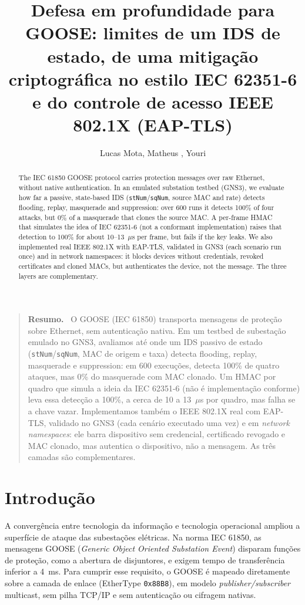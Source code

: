 \documentclass[12pt]{article}
\title{Defesa em profundidade para GOOSE: limites de um IDS de estado, de uma mitigação criptográfica no estilo IEC 62351-6 e do controle de acesso IEEE 802.1X (EAP-TLS)}
\author{Lucas Mota\inst{1}, Matheus \verif\inst{1}, Youri \verif\inst{1}}
\newenvironment{resumo}{\begin{quote}\textbf{Resumo.}\ }{\end{quote}}%
\begin{document}
\maketitle

\begin{abstract}
  The IEC 61850 GOOSE protocol carries protection messages over raw Ethernet, without native authentication. In an emulated substation testbed (GNS3), we evaluate how far a passive, state-based IDS (\texttt{stNum}/\texttt{sqNum}, source MAC and rate) detects flooding, replay, masquerade and suppression: over 600 runs it detects 100\% of four attacks, but 0\% of a masquerade that clones the source MAC. A per-frame HMAC that simulates the idea of IEC 62351-6 (not a conformant implementation) raises that detection to 100\% for about 10--13~$\mu$s per frame, but fails if the key leaks. We also implemented real IEEE 802.1X with EAP-TLS, validated in GNS3 (each scenario run once) and in network namespaces: it blocks devices without credentials, revoked certificates and cloned MACs, but authenticates the device, not the message. The three layers are complementary.
\end{abstract}

\begin{resumo}
  O GOOSE (IEC 61850) transporta mensagens de prote\c{c}\~ao sobre Ethernet, sem autentica\c{c}\~ao nativa. Em um testbed de subesta\c{c}\~ao emulado no GNS3, avaliamos at\'e onde um IDS passivo de estado (\texttt{stNum}/\texttt{sqNum}, MAC de origem e taxa) detecta flooding, replay, masquerade e suppression: em 600 execu\c{c}\~oes, detecta 100\% de quatro ataques, mas 0\% do masquerade com MAC clonado. Um HMAC por quadro que simula a ideia da IEC 62351-6 (n\~ao \'e implementa\c{c}\~ao conforme) leva essa detec\c{c}\~ao a 100\%, a cerca de 10 a 13~$\mu$s por quadro, mas falha se a chave vazar. Implementamos tamb\'em o IEEE 802.1X real com EAP-TLS, validado no GNS3 (cada cen\'ario executado uma vez) e em \emph{network namespaces}: ele barra dispositivo sem credencial, certificado revogado e MAC clonado, mas autentica o dispositivo, n\~ao a mensagem. As tr\^es camadas s\~ao complementares.
\end{resumo}

\section{Introdu\c{c}\~ao}

A converg\^encia entre tecnologia da informa\c{c}\~ao e tecnologia operacional ampliou a superf\'icie de ataque das subesta\c{c}\~oes el\'etricas. Na norma IEC 61850, as mensagens GOOSE (\emph{Generic Object Oriented Substation Event}) disparam fun\c{c}\~oes de prote\c{c}\~ao, como a abertura de disjuntores, e exigem tempo de transfer\^encia inferior a 4~ms. Para cumprir esse requisito, o GOOSE \'e mapeado diretamente sobre a camada de enlace (EtherType \texttt{0x88B8}), em modelo \emph{publisher/subscriber} multicast, sem pilha TCP/IP e sem autentica\c{c}\~ao ou cifragem nativas.
\end{document}
